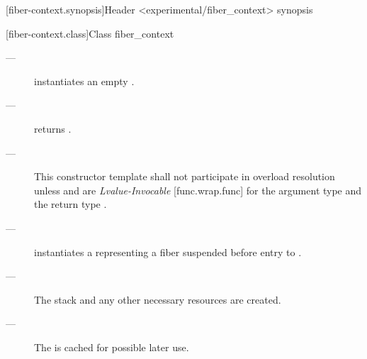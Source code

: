 
[fiber-context.synopsis]{Header <experimental/fiber\_context> synopsis}


[fiber-context.class]{Class fiber\_context}


\label{constructor}

\effects
\begin{description}
    \item[---] instantiates an empty \fiber.
\end{description}

\postcond
\begin{description}
    \item[---]  returns .
\end{description}


\constraints
\begin{description}
    \item[---] This constructor template shall not participate in overload
              resolution unless  and 
              are \emph{Lvalue-Invocable} [func.wrap.func] for the argument
              type  and the return type \fiber.\\
\end{description}

\effects
\begin{description}
    \item[---] instantiates a \fiber representing a fiber suspended before
              entry to .
    \item[---] The stack and any other necessary resources are created.
    \item[---] The \emph{\cancelfn}\xspace{} is cached for possible
              later use.
\end{description}

